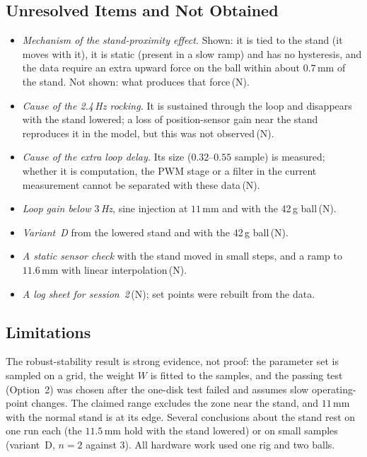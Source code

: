 \documentclass[11pt,a4paper]{article}
\newcommand{\st}[1]{\,\textup{(#1)}}
\begin{document}
\subsection{Unresolved Items and Not Obtained}
\label{sec:disc-open}
\begin{itemize}
\item \emph{Mechanism of the stand-proximity effect.} Shown: it is tied to the stand (it moves with it), it is static (present in a
      slow ramp) and has no hysteresis, and the data require an extra upward force on the ball within about $0.7$\,mm of the stand.
      Not shown: what produces that force\st{N}.
\item \emph{Cause of the 2.4\,Hz rocking.} It is sustained through the loop and disappears with the stand lowered; a loss of
      position-sensor gain near the stand reproduces it in the model, but this was not observed\st{N}.
\item \emph{Cause of the extra loop delay.} Its size ($0.32$--$0.55$ sample) is measured; whether it is computation, the PWM stage
      or a filter in the current measurement cannot be separated with these data\st{N}.
\item \emph{Loop gain below $3$\,Hz}, sine injection at $11$\,mm and with the 42\,g ball\st{N}.
\item \emph{Variant~D} from the lowered stand and with the 42\,g ball\st{N}.
\item \emph{A static sensor check} with the stand moved in small steps, and a ramp to $11.6$\,mm with linear interpolation\st{N}.
\item \emph{A log sheet for session~2}\st{N}; set points were rebuilt from the data.
\end{itemize}

\subsection{Limitations}
\label{sec:disc-limits}
The robust-stability result is strong evidence, not proof: the parameter set is sampled on a grid, the weight $W$ is fitted to the
samples, and the passing test (Option~2) was chosen after the one-disk test failed and assumes slow operating-point changes. The
claimed range excludes the zone near the stand, and $11$\,mm with the normal stand is at its edge. Several conclusions about the
stand rest on one run each (the $11.5$\,mm hold with the stand lowered) or on small samples (variant~D, $n = 2$ against $3$). All
hardware work used one rig and two balls.
\end{document}
